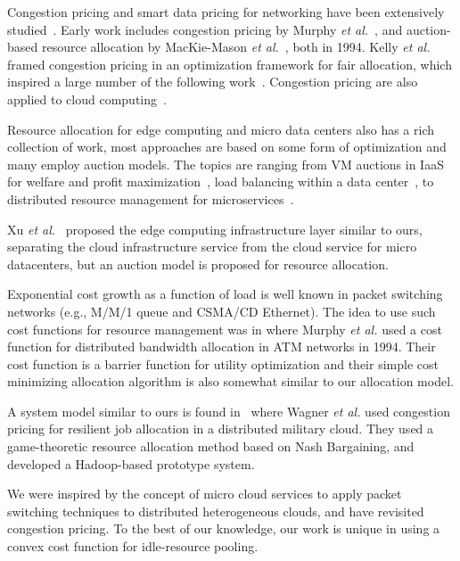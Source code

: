 Congestion pricing and smart data pricing for networking have been
extensively studied~\cite{Sen-2013}.
Early work includes congestion pricing by
Murphy {\em et al.}~\cite{Murphy94distributedpricing},
and auction-based resource allocation by
MacKie-Mason {\em et al.}~\cite{pricing-internet-1994}, both in 1994.
Kelly {\em et al.}~\cite{Kelly-1998} framed congestion pricing in an
optimization framework for fair allocation, which inspired a large
number of the following
work~\cite{Sen-2013,gibbens1999resource,Henderson2001,Briscoe2003-M3I}.
Congestion pricing are also applied to cloud
computing~\cite{Wang-hotcloud2010,Song-2014,Kilcioglu-SIGMETRICS2015,Song-INFOCOM2017}.

Resource allocation for edge computing and micro data centers also has
a rich collection of work, most approaches are based on some form of
optimization and many employ auction models.
The topics are ranging from VM auctions in IaaS for welfare and profit
maximization~\cite{Xu2017-zenith,Zhang2017-VMauction},
load balancing within a data center~\cite{Rikhtegar2021BiTEAD,Chen-SOCC-2014},
to
distributed resource management for microservices~\cite{Suresh-SOA-SOCC2017}.

Xu {\em et al.}~\cite{Xu2017-zenith} proposed the edge computing
infrastructure layer similar to ours, separating the cloud
infrastructure service from the cloud service for micro datacenters,
but an auction model is proposed for resource allocation.

Exponential cost growth as a function of load is well known in packet
switching networks (e.g., M/M/1 queue and CSMA/CD Ethernet).
The idea to use such cost functions for resource management
was in \cite{Murphy94distributedpricing} where
Murphy {\em et al.} used a cost function for distributed bandwidth
allocation in ATM networks in 1994.
Their cost function is a barrier function for utility optimization
and their simple cost minimizing allocation algorithm is also somewhat
similar to our allocation model.

A system model similar to ours is found in~\cite{Wagner-2012} where
Wagner {\em et al.} used congestion pricing for resilient job
allocation in a distributed military cloud.  They used a
game-theoretic resource allocation method based on Nash Bargaining,
and developed a Hadoop-based prototype system.

We were inspired by the concept of micro cloud services to apply packet
switching techniques to distributed heterogeneous clouds, and have
revisited congestion pricing.
To the best of our knowledge, our work is unique in using a convex
cost function for idle-resource pooling.



